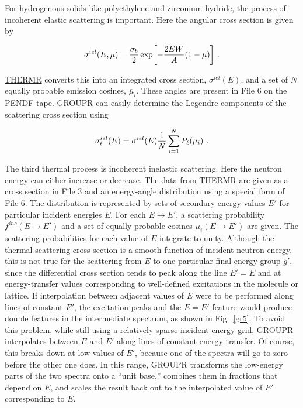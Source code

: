 For hydrogenous solids like polyethylene and zirconium hydride, the
process of incoherent elastic scattering
is important.  Here the angular cross section is given by

  \begin{equation}
    \sigma^{iel}(E,\mu)={{\sigma_b}\over 2}
    \exp \biggl[ -{{2EW}\over A} (1-\mu) \biggr]\,\,.
  \end{equation}
\vspace{0.5 pt}

\noindent
\hyperlink{sTHERMRhy}{THERMR} converts this into
an integrated cross section, $\sigma^{iel}(E)$, and a set of $N$
equally probable emission cosines, $\overline{\mu}_i$.  These angles
are present in File 6 on the PENDF tape.  GROUPR can easily determine
the Legendre components of the scattering cross section using

  \begin{equation}
    \sigma^{iel}_{\ell} (E)=\sigma^{iel}(E)
    {{1}\over {N}} \sum_{i=1}^N P_{\ell} (\mu_i )\,\,.
  \label{Eq69}
  \end{equation}

The third thermal process is incoherent inelastic scattering.
 Here the neutron energy can either
increase or decrease.  The data from
\hyperlink{sTHERMRhy}{THERMR} are given as a
cross section in File 3 and an energy-angle distribution
using a special form of File 6.  The distribution is
represented by sets of secondary-energy values $E'$ for particular
incident energies $E$.  For each $E{\rightarrow}E'$, a scattering
probability $f^{inc} (E{\rightarrow}E')$ and a set of equally probable
cosines $\mu_i (E{\rightarrow}E')$ are given.  The scattering probabilities
for each value of $E$ integrate to unity.  Although the thermal
scattering cross section is a smooth function of incident neutron energy,
this is not true for the scattering from $E$ to one particular final
energy group $g'$, since the differential cross section tends to peak
along the line $E'{=}E$ and at energy-transfer values corresponding
to well-defined excitations in the molecule or lattice.  If interpolation
between adjacent values of $E$ were to be performed along lines of
constant $E'$, the excitation peaks and the $E{=}E'$ feature would
produce double features in the intermediate spectrum, as shown in
Fig.~\ref{gr5}.  To avoid this problem, while still using a
relatively sparse incident energy grid, GROUPR interpolates between
$E$ and $E'$ along lines of constant energy transfer.  Of course, this
breaks down at low values of $E'$, because one of the spectra will go
to zero before the other one does.  In this range, GROUPR transforms
the low-energy parts of the two spectra onto a ``unit base,'' combines
them in fractions that depend on $E$, and scales the result back out
to the interpolated value of $E'$ corresponding to $E$.

